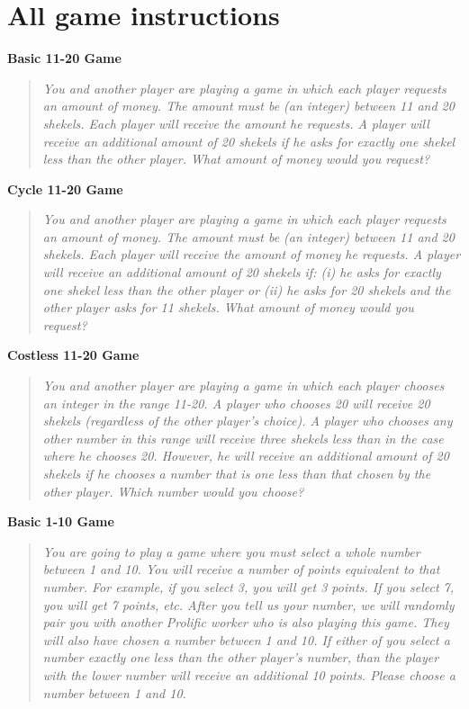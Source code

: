 \section{All game instructions}
\label{app:instruct}

\noindent\textbf{Basic 11-20 Game}
\begin{quote}
\emph{You and another player are playing a game in which each player requests an amount of money. The amount must be (an integer) between 11 and 20 shekels.  Each player will receive the amount he requests. A player will receive an additional amount of 20 shekels if he asks for exactly one shekel less than the other player. What amount of money would you request?}
\end{quote}

\noindent\textbf{Cycle 11-20 Game}
\begin{quote}
\emph{You and another player are playing a game in which each player requests an amount of money.
The amount must be (an integer) between 11 and 20 shekels. 
Each player will receive the amount of money he requests.
A player will receive an additional amount of 20 shekels if: (i)  he asks for exactly one shekel less than the other player or  (ii) he asks for 20 shekels and the other player asks for 11 shekels.
What amount of money would you request?}
\end{quote}

\noindent\textbf{Costless 11-20 Game}
\begin{quote}
\emph{You and another player are playing a game in which each player chooses an integer in the range 11-20.
A player who chooses 20 will receive 20 shekels (regardless of the other player's choice). 
A player who chooses any other number in this range will receive three shekels less than in the case where he chooses 20. 
However, he will receive an additional amount of 20 shekels if he chooses a number that is one less than that chosen by the other player. 
Which number would you choose?}
\end{quote}

\noindent\textbf{Basic 1-10 Game}
\begin{quote}
\emph{You are going to play a game where you must select a whole number between 1 and 10.
You will receive a number of points equivalent to that number. For example, if you select 3, you will get 3 points. 
If you select 7, you will get 7 points, etc.
After you tell us your number, we will randomly pair you with another Prolific worker who is also playing this game. 
They will also have chosen a number between 1 and 10.
If either of you select a number exactly one less than the other player's number, than the player with the lower number will receive an additional 10 points.
Please choose a number between 1 and 10. }
\end{quote}

